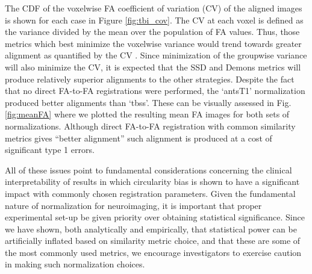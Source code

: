 \documentclass[final,5p,times,twocolumn]{elsarticle}
\begin{document}




The CDF of the voxelwise FA coefficient of variation (CV) of the aligned
images is shown for each case in Figure \ref{fig:tbi_cov}.  
The CV at each voxel is defined as the variance
divided by the mean over the population of FA values.  Thus,
those metrics which best minimize the voxelwise variance would
trend towards greater alignment as quantified by the CV \citep{van-hecke2011}.
Since minimization of the groupwise variance
will also minimize the CV, it is expected that the SSD and Demons 
metrics will produce relatively superior alignments to the
other strategies.  Despite the fact that no direct FA-to-FA 
registrations were performed, the `antsT1' normalization produced better alignments
than `tbss'.  These can be visually assessed in Fig. \ref{fig:meanFA} where
we plotted the resulting mean FA images for both sets of normalizations.
Although direct FA-to-FA registration with common
similarity metrics gives ``better alignment'' such alignment is 
produced at a cost of significant type 1 errors.  

All of these issues point to fundamental considerations concerning the
clinical interpretability of results in which circularity bias is shown 
to have a significant impact with commonly chosen registration 
parameters.  Given the fundamental nature of normalization for
neuroimaging, it is important that proper experimental set-up be
given priority over obtaining statistical significance.  Since
we have shown, both analytically and empirically,  that statistical 
power can be artificially inflated based on similarity metric choice,
and that these are some of the most commonly used metrics, we encourage
investigators to exercise caution in making such normalization choices.
\end{document}
